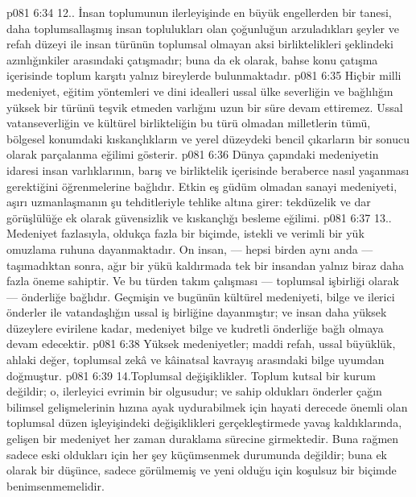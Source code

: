 \vs p081 6:34 12.. İnsan toplumunun ilerleyişinde en büyük engellerden bir tanesi, daha toplumsallaşmış insan toplulukları olan çoğunluğun arzuladıkları şeyler ve refah düzeyi ile insan türünün toplumsal olmayan aksi birliktelikleri şeklindeki azınlığınkiler arasındaki çatışmadır; buna da ek olarak, bahse konu çatışma içerisinde toplum karşıtı yalnız bireylerde bulunmaktadır.
\vs p081 6:35 Hiçbir milli medeniyet, eğitim yöntemleri ve dini idealleri ussal ülke severliğin ve bağlılığın yüksek bir türünü teşvik etmeden varlığını uzun bir süre devam ettiremez. Ussal vatanseverliğin ve kültürel birlikteliğin bu türü olmadan milletlerin tümü, bölgesel konumdaki kıskançlıkların ve yerel düzeydeki bencil çıkarların bir sonucu olarak parçalanma eğilimi gösterir.
\vs p081 6:36 Dünya çapındaki medeniyetin idaresi insan varlıklarının, barış ve birliktelik içerisinde beraberce nasıl yaşanması gerektiğini öğrenmelerine bağlıdır. Etkin eş güdüm olmadan sanayi medeniyeti, aşırı uzmanlaşmanın şu tehditleriyle tehlike altına girer: tekdüzelik ve dar görüşlülüğe ek olarak güvensizlik ve kıskançlığı besleme eğilimi.
\vs p081 6:37 13.\bibnobreakspace {}. Medeniyet fazlasıyla, oldukça fazla bir biçimde, istekli ve verimli bir yük omuzlama ruhuna dayanmaktadır. On insan, --- hepsi birden aynı anda --- taşımadıktan sonra, ağır bir yükü kaldırmada tek bir insandan yalnız biraz daha fazla öneme sahiptir. Ve bu türden takım çalışması --- toplumsal işbirliği olarak --- önderliğe bağlıdır. Geçmişin ve bugünün kültürel medeniyeti, bilge ve ilerici önderler ile vatandaşlığın ussal iş birliğine dayanmıştır; ve insan daha yüksek düzeylere evirilene kadar, medeniyet bilge ve kudretli önderliğe bağlı olmaya devam edecektir.
\vs p081 6:38 Yüksek medeniyetler; maddi refah, ussal büyüklük, ahlaki değer, toplumsal zekâ ve kâinatsal kavrayış arasındaki bilge uyumdan doğmuştur.
\vs p081 6:39 14.\bibnobreakspace Toplumsal değişiklikler. Toplum kutsal bir kurum değildir; o, ilerleyici evrimin bir olgusudur; ve sahip oldukları önderler çağın bilimsel gelişmelerinin hızına ayak uydurabilmek için hayati derecede önemli olan toplumsal düzen işleyişindeki değişiklikleri gerçekleştirmede yavaş kaldıklarında, gelişen bir medeniyet her zaman duraklama sürecine girmektedir. Buna rağmen sadece eski oldukları için her şey küçümsenmek durumunda değildir; buna ek olarak bir düşünce, sadece görülmemiş ve yeni olduğu için koşulsuz bir biçimde benimsenmemelidir.
